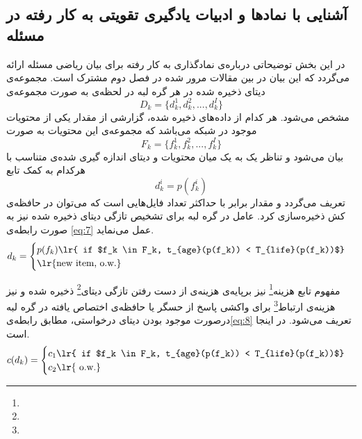 \subsection{آشنایی با نمادها و ادبیات یادگیری تقویتی به کار رفته در مسئله}
در این بخش توضیحاتی درباره‌ی نمادگذاری به کار رفته برای بیان ریاضی مسئله ارائه می‌گردد که این بیان در بین مقالات مرور شده در فصل دوم مشترک است.  مجموعه‌ی دیتای ذخیره شده در هر گره لبه در لحظه‌ی  به صورت مجموعه‌ی 
\begin{equation}\label{eq4}
	D_k = \{d_k^1, d_k^2, ..., d_k^I\}
\end{equation}
 مشخص می‌شود. هر کدام از داده‌های ذخیره شده، گزارشی از مقدار یکی از محتویات موجود در شبکه می‌باشد که مجموعه‌ی این محتویات به صورت 
\begin{equation}\label{eq5}
	F_k = \{f_k^1, f_k^2, ..., f_k^I\}
\end{equation}
بیان می‌شود و تناظر یک به یک میان محتویات و دیتای اندازه گیری شده‌ی متناسب با هرکدام به کمک تابع 
\begin{equation}\label{eq6}
	d_k^i = p(f_k^i)
\end{equation}
 تعریف می‌گردد و مقدار  برابر با حداکثر تعداد فایل‌هایی است که می‌توان در حافظه‌ی کش ذخیره‌سازی کرد. عامل در گره لبه برای تشخیص تازگی دیتای ذخیره شده نیز به صورت رابطه‌ی \ref{eq:7} عمل می‌نماید.
 \begin{equation}\label{eq:7}
 	d_k = \begin{cases}
 		p(f_k) \text{\lr{ if $f_k \in F_k, t_{age}(p(f_k)) < T_{life}(p(f_k))$}}\\
 		\text{\lr{new item, o.w.}}
 	\end{cases}
 \end{equation}

مفهوم تابع هزینه\footnote{} نیز برپایه‌ی هزینه‌ی از دست رفتن تازگی دیتای\footnote{} ذخیره شده و نیز هزینه‌ی ارتباط\footnote{} برای واکشی پاسخ از حسگر یا حافظه‌ی اختصاص یافته در گره لبه درصورت موجود بودن دیتای درخواستی، مطابق رابطه‌ی\ref{eq:8} تعریف می‌شود. در اینجا  است.
\begin{equation}\label{eq:8}
	c(d_k) = \begin{cases}
		c_1 \text{\lr{ if $f_k \in F_k, t_{age}(p(f_k)) < T_{life}(p(f_k))$}}\\
		c_2 \text{\lr{ o.w.}}
	\end{cases}
\end{equation}  
 
